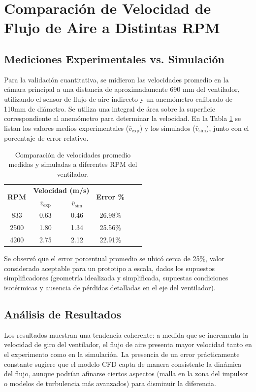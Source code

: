 \newpage
\section{Comparación de Velocidad de Flujo de Aire a Distintas RPM}
\subsection{Mediciones Experimentales vs. Simulación}
Para la validación cuantitativa, se midieron las velocidades promedio en la cámara principal a una distancia de aproximadamente 690 mm del ventilador, utilizando el sensor de flujo de aire indirecto y un anemómetro calibrado de 110mm de diámetro. Se utiliza una integral de área sobre la superficie correspondiente al anemómetro para determinar la velocidad. En la Tabla \ref{tab:comp_velocidades} se listan los valores medios experimentales (\(\bar{v}_{\text{exp}}\)) y los simulados (\(\bar{v}_{\text{sim}}\)), junto con el porcentaje de error relativo.

\begin{table}[htbp]
    \centering
    \caption{Comparación de velocidades promedio medidas y simuladas a diferentes RPM del ventilador.}
    \label{tab:comp_velocidades}
    \begin{tabular}{cccccc}
    \toprule
    \multirow{2}{*}{\textbf{RPM}} & \multicolumn{2}{c}{\textbf{Velocidad (m/s)}} & \multirow{2}{*}{\textbf{Error \%}} \\
    \cmidrule(r){2-3}
    & $\bar{v}_{\text{exp}}$ & $\bar{v}_{\text{sim}}$ &  \\
    \midrule
    833 & 0.63 & 0.46 & 26.98\% \\
    2500 & 1.80 & 1.34 & 25.56\% \\
    4200 & 2.75 & 2.12 & 22.91\% \\
    \bottomrule
    \end{tabular}
\end{table}

Se observó que el error porcentual promedio se ubicó cerca de 25\%, valor considerado aceptable para un prototipo a escala, dados los supuestos simplificadores (geometría idealizada y simplificada, supuestas condiciones isotérmicas y ausencia de pérdidas detalladas en el eje del ventilador).

\subsection{Análisis de Resultados}
Los resultados muestran una tendencia coherente: a medida que se incrementa la velocidad de giro del ventilador, el flujo de aire presenta mayor velocidad tanto en el experimento como en la simulación. La presencia de un error prácticamente constante sugiere que el modelo CFD capta de manera consistente la dinámica del flujo, aunque podrían afinarse ciertos aspectos (malla en la zona del impulsor o modelos de turbulencia más avanzados) para disminuir la diferencia.

